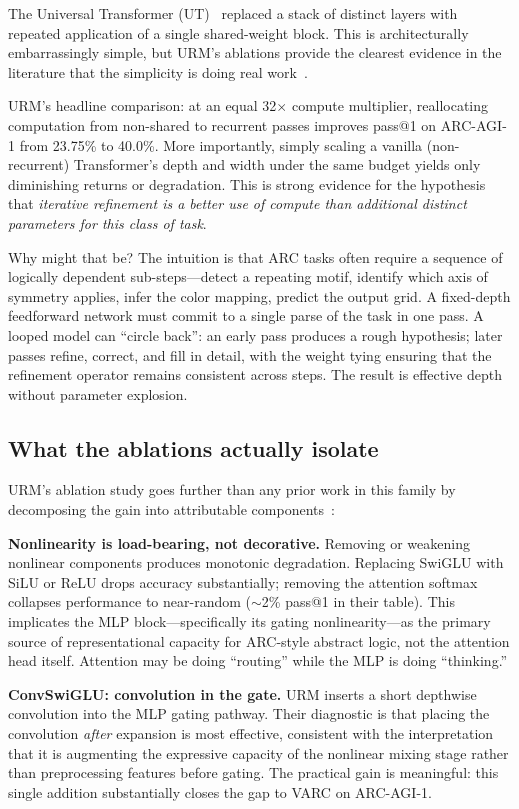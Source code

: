 \documentclass[11pt, letterpaper]{article}
\begin{document}
The Universal Transformer (UT)~\cite{dehghani2019ut} replaced a stack of
distinct layers with repeated application of a single shared-weight block.
This is architecturally embarrassingly simple, but URM's ablations provide
the clearest evidence in the literature that the simplicity is doing real
work~\cite{gao2025urm}.

URM's headline comparison: at an equal 32$\times$ compute multiplier,
reallocating computation from non-shared to recurrent passes improves
pass@1 on ARC-AGI-1 from 23.75\% to 40.0\%. More importantly, simply
scaling a vanilla (non-recurrent) Transformer's depth and width under the
same budget yields only diminishing returns or degradation. This is strong
evidence for the hypothesis that \emph{iterative refinement is a better use
of compute than additional distinct parameters for this class of task}.

Why might that be? The intuition is that ARC tasks often require a sequence
of logically dependent sub-steps---detect a repeating motif, identify which
axis of symmetry applies, infer the color mapping, predict the output grid.
A fixed-depth feedforward network must commit to a single parse of the task
in one pass. A looped model can ``circle back'': an early pass produces
a rough hypothesis; later passes refine, correct, and fill in detail, with
the weight tying ensuring that the refinement operator remains consistent
across steps. The result is effective depth without parameter explosion.

\subsection{What the ablations actually isolate}

URM's ablation study goes further than any prior work in this family by
decomposing the gain into attributable components~\cite{gao2025urm}:

\textbf{Nonlinearity is load-bearing, not decorative.} Removing or weakening
nonlinear components produces monotonic degradation. Replacing SwiGLU with
SiLU or ReLU drops accuracy substantially; removing the attention softmax
collapses performance to near-random ($\sim$2\% pass@1 in their table).
This implicates the MLP block---specifically its gating nonlinearity---as the
primary source of representational capacity for ARC-style abstract logic,
not the attention head itself. Attention may be doing ``routing'' while the
MLP is doing ``thinking.''

\textbf{ConvSwiGLU: convolution in the gate.} URM inserts a short depthwise
convolution into the MLP gating pathway. Their diagnostic is that placing
the convolution \emph{after} expansion is most effective, consistent with
the interpretation that it is augmenting the expressive capacity of the
nonlinear mixing stage rather than preprocessing features before gating.
The practical gain is meaningful: this single addition substantially closes
the gap to VARC on ARC-AGI-1.
\end{document}
